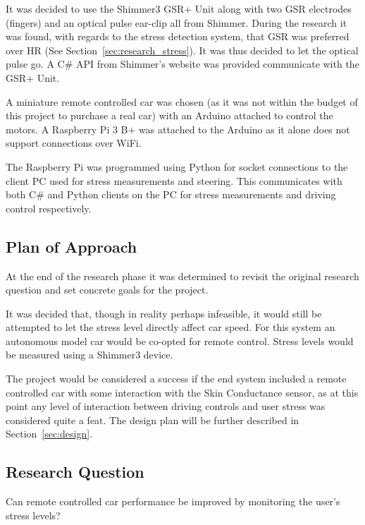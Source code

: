 It was decided to use the Shimmer3 GSR+ Unit along with two GSR electrodes
(fingers) and an optical pulse ear-clip all from Shimmer. During the
research it was found, with regards to the stress detection system, that
GSR was preferred over HR (See Section~\ref{sec:research_stress}). It was
thus decided to let the optical pulse go. A C\# API from Shimmer's website
was provided communicate with the GSR+ Unit.

A miniature remote controlled car was chosen (as it was not within the budget
of this project to purchase a real car) with an Arduino attached to control
the motors. A Raspberry Pi 3 B+ was attached to the Arduino as it alone does
not support connections over WiFi.

The Raspberry Pi was programmed using Python for socket connections to the
client PC used for stress measurements and steering. This communicates with
both C\# and Python clients on the PC for stress measurements and driving
control respectively.

\subsection{Plan of Approach}\label{sec:plan_of_approach}

At the end of the research phase it was determined to revisit the original
research question and set concrete goals for the project. 

It was decided that, though in reality perhaps infeasible, it would still
be attempted to let the stress level directly affect car speed. For this system
an autonomous model car would be co-opted for remote control. Stress levels
would be measured using a Shimmer3 device.

The project would be considered a success if the end system included a remote
controlled car with some interaction with the Skin Conductance sensor, as at
this point any level of interaction between driving controls and user stress
was considered quite a feat.  The design plan will be further described in
Section~\ref{sec:design}.

\subsection{Research Question}\label{sec:amended_research_question}

Can remote controlled car performance be improved by monitoring the user's
stress levels?
